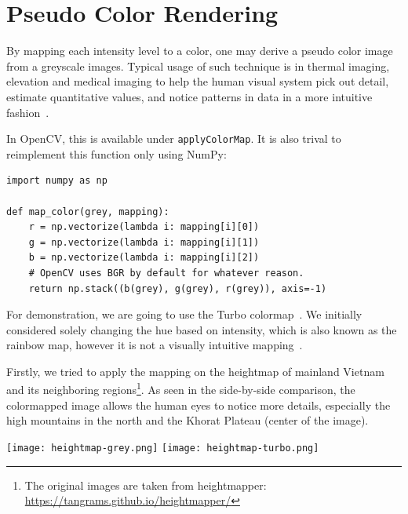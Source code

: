 \documentclass[a4paper,12pt]{article}
\begin{document}
\section{Pseudo Color Rendering}
By mapping each intensity level to a color, one may derive a pseudo color image
from a greyscale images.  Typical usage of such technique is in thermal imaging,
elevation and medical imaging to help the human visual system pick out detail,
estimate quantitative values, and notice patterns in data in a more intuitive
fashion~\cite{turbo}.

In OpenCV, this is available under \verb|applyColorMap|.  It is also trival
to reimplement this function only using NumPy:
\begin{verbatim}
import numpy as np

def map_color(grey, mapping):
    r = np.vectorize(lambda i: mapping[i][0])
    g = np.vectorize(lambda i: mapping[i][1])
    b = np.vectorize(lambda i: mapping[i][2])
    # OpenCV uses BGR by default for whatever reason.
    return np.stack((b(grey), g(grey), r(grey)), axis=-1)
\end{verbatim}

For demonstration, we are going to use the Turbo colormap~\cite{turbo}.
We initially considered solely changing the hue based on intensity,
which is also known as the rainbow map, however it is not a visually
intuitive mapping~\cite{rainbowbad}.

Firstly, we tried to apply the mapping on the heightmap of mainland Vietnam and
its neighboring regions\footnote{The original images are taken from
heightmapper: \url{https://tangrams.github.io/heightmapper/}}.  As seen in
the side-by-side comparison, the colormapped image allows the human eyes
to notice more details, especially the high mountains in the north and
the Khorat Plateau (center of the image).
\begin{center}
  \texttt{[image: heightmap-grey.png]}
  \texttt{[image: heightmap-turbo.png]}
\end{center}
\end{document}
